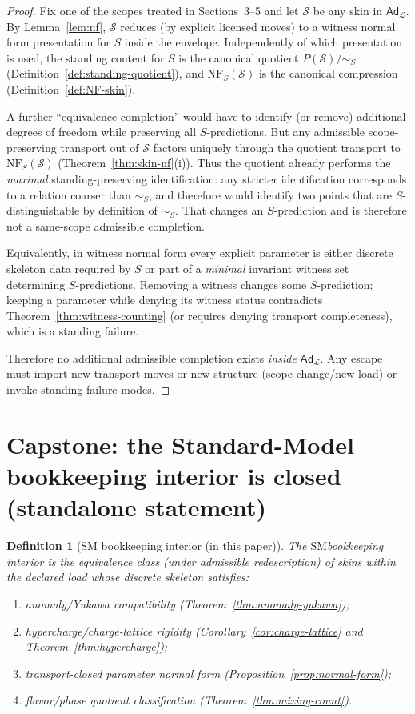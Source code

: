 \documentclass[11pt]{article}
\newtheorem{definition}{Definition}[section]
\theoremstyle{remark}
\newcommand{\SM}{\ensuremath{\mathrm{SM}}}
\newcommand{\Skin}{\mathcal{S}}
\newcommand{\Load}{\mathcal{L}}
\newcommand{\Ad}{\ensuremath{\mathsf{Ad}}}
\begin{document}
\begin{proof}
Fix one of the scopes treated in Sections~3--5 and let $\Skin$ be any skin in $\Ad_{\Load}$.
By Lemma~\ref{lem:nf}, $\Skin$ reduces (by explicit licensed moves) to a witness normal form presentation for $S$
inside the envelope.
Independently of which presentation is used, the standing content for $S$ is the canonical quotient
$P(\Skin)/\!\sim_S$ (Definition~\ref{def:standing-quotient}), and $\mathrm{NF}_S(\Skin)$ is the canonical
compression (Definition~\ref{def:NF-skin}).

A further ``equivalence completion'' would have to identify (or remove) additional degrees of freedom while
preserving all $S$-predictions.
But any admissible scope-preserving transport out of $\Skin$ factors uniquely through the quotient transport
to $\mathrm{NF}_S(\Skin)$ (Theorem~\ref{thm:skin-nf}(i)).
Thus the quotient already performs the \emph{maximal} standing-preserving identification: any stricter
identification corresponds to a relation coarser than $\sim_S$, and therefore would identify two points that
are $S$-distinguishable by definition of $\sim_S$.
That changes an $S$-prediction and is therefore not a same-scope admissible completion.

Equivalently, in witness normal form every explicit parameter is either discrete skeleton data required by $S$ or
part of a \emph{minimal} invariant witness set determining $S$-predictions.
Removing a witness changes some $S$-prediction; keeping a parameter while denying its witness status contradicts
Theorem~\ref{thm:witness-counting} (or requires denying transport completeness), which is a standing failure.

Therefore no additional admissible completion exists \emph{inside} $\Ad_{\Load}$. Any escape must import new
transport moves or new structure (scope change/new load) or invoke standing-failure modes.
\end{proof}


\section{Capstone: the Standard-Model bookkeeping interior is closed (standalone statement)}

\begin{definition}[SM bookkeeping interior (in this paper)]\label{def:interior}
The \emph{\SM bookkeeping interior} is the equivalence class (under admissible redescription) of skins
within the declared load whose discrete skeleton satisfies:
\begin{enumerate}[label=(\roman*),leftmargin=2.2em]
\item anomaly/Yukawa compatibility (Theorem~\ref{thm:anomaly-yukawa});
\item hypercharge/charge-lattice rigidity (Corollary~\ref{cor:charge-lattice} and Theorem~\ref{thm:hypercharge});
\item transport-closed parameter normal form (Proposition~\ref{prop:normal-form});
\item flavor/phase quotient classification (Theorem~\ref{thm:mixing-count}).
\end{enumerate}
\end{definition}
\end{document}
